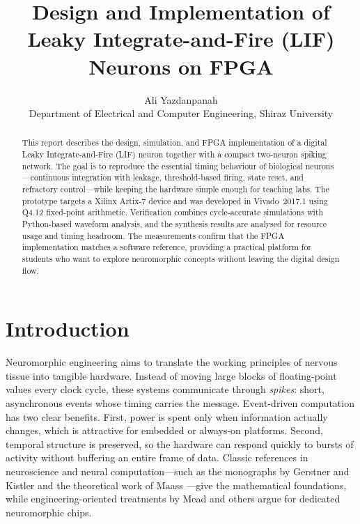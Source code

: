 \documentclass[10pt,onecolumn]{IEEEtran}
\title{Design and Implementation of Leaky Integrate-and-Fire (LIF) Neurons on FPGA}
\author{Ali Yazdanpanah\\
Department of Electrical and Computer Engineering, Shiraz University}
\date{} %
\begin{document}
\maketitle

\begin{abstract}
This report describes the design, simulation, and FPGA implementation of a digital Leaky Integrate-and-Fire (LIF) neuron together with a compact two-neuron spiking network. The goal is to reproduce the essential timing behaviour of biological neurons—continuous integration with leakage, threshold-based firing, state reset, and refractory control—while keeping the hardware simple enough for teaching labs. The prototype targets a Xilinx Artix-7 device and was developed in Vivado~2017.1 using Q4.12 fixed-point arithmetic. Verification combines cycle-accurate simulations with Python-based waveform analysis, and the synthesis results are analysed for resource usage and timing headroom. The measurements confirm that the FPGA implementation matches a software reference, providing a practical platform for students who want to explore neuromorphic concepts without leaving the digital design flow.
\end{abstract}

\section{Introduction}
\label{sec:intro}

Neuromorphic engineering aims to translate the working principles of nervous tissue into tangible hardware. Instead of moving large blocks of floating-point values every clock cycle, these systems communicate through \emph{spikes}: short, asynchronous events whose timing carries the message. Event-driven computation has two clear benefits. First, power is spent only when information actually changes, which is attractive for embedded or always-on platforms. Second, temporal structure is preserved, so the hardware can respond quickly to bursts of activity without buffering an entire frame of data. Classic references in neuroscience and neural computation—such as the monographs by Gerstner and Kistler \cite{GerstnerKistler2002} and the theoretical work of Maass \cite{Maass1997}—give the mathematical foundations, while engineering-oriented treatments by Mead \cite{Mead1990} and others argue for dedicated neuromorphic chips.
\end{document}
